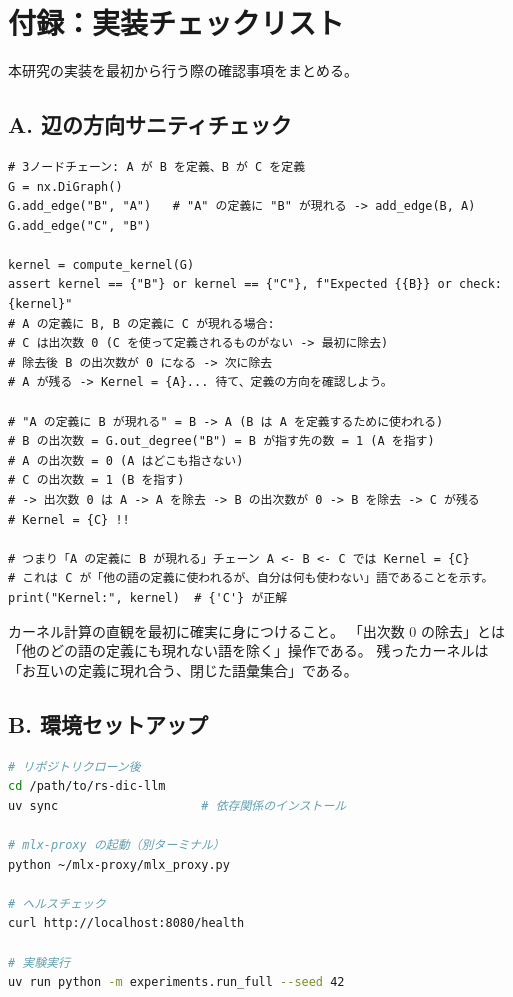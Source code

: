 \documentclass[lang=jp, color=black, mode=simple, 11pt]{elegantbook}
\begin{document}
\chapter*{付録：実装チェックリスト}

本研究の実装を最初から行う際の確認事項をまとめる。

\section*{A. 辺の方向サニティチェック}

\begin{lstlisting}[caption=最初に必ず実行すること]
# 3ノードチェーン: A が B を定義、B が C を定義
G = nx.DiGraph()
G.add_edge("B", "A")   # "A" の定義に "B" が現れる -> add_edge(B, A)
G.add_edge("C", "B")

kernel = compute_kernel(G)
assert kernel == {"B"} or kernel == {"C"}, f"Expected {{B}} or check: {kernel}"
# A の定義に B, B の定義に C が現れる場合:
# C は出次数 0 (C を使って定義されるものがない -> 最初に除去)
# 除去後 B の出次数が 0 になる -> 次に除去
# A が残る -> Kernel = {A}... 待て、定義の方向を確認しよう。

# "A の定義に B が現れる" = B -> A (B は A を定義するために使われる)
# B の出次数 = G.out_degree("B") = B が指す先の数 = 1 (A を指す)
# A の出次数 = 0 (A はどこも指さない)
# C の出次数 = 1 (B を指す)
# -> 出次数 0 は A -> A を除去 -> B の出次数が 0 -> B を除去 -> C が残る
# Kernel = {C} !!

# つまり「A の定義に B が現れる」チェーン A <- B <- C では Kernel = {C}
# これは C が「他の語の定義に使われるが、自分は何も使わない」語であることを示す。
print("Kernel:", kernel)  # {'C'} が正解
\end{lstlisting}

\begin{note}
  カーネル計算の直観を最初に確実に身につけること。
  「出次数 0 の除去」とは「他のどの語の定義にも現れない語を除く」操作である。
  残ったカーネルは「お互いの定義に現れ合う、閉じた語彙集合」である。
\end{note}

\section*{B. 環境セットアップ}

\begin{lstlisting}[language=bash, caption=プロジェクトのセットアップ]
# リポジトリクローン後
cd /path/to/rs-dic-llm
uv sync                    # 依存関係のインストール

# mlx-proxy の起動（別ターミナル）
python ~/mlx-proxy/mlx_proxy.py

# ヘルスチェック
curl http://localhost:8080/health

# 実験実行
uv run python -m experiments.run_full --seed 42
\end{lstlisting}
\end{document}
